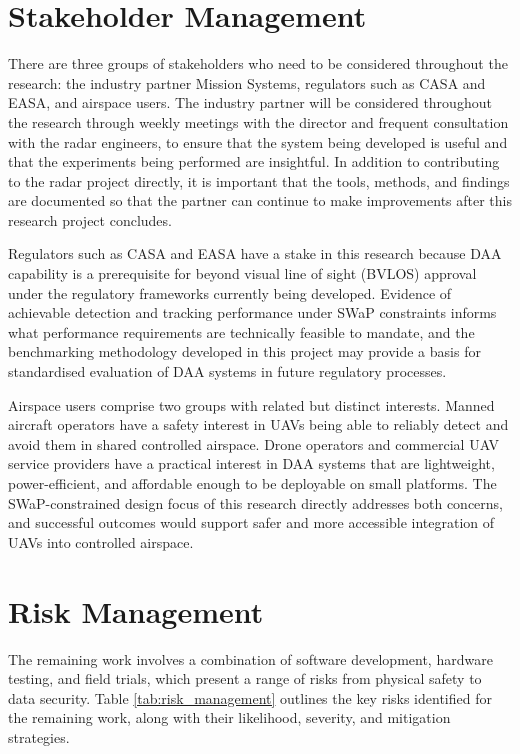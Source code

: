 \section{Stakeholder Management}
There are three groups of stakeholders who need to be considered throughout the research: the industry partner Mission Systems, regulators such as CASA and EASA, and airspace users. The industry partner will be considered throughout the research through weekly meetings with the director and frequent consultation with the radar engineers, to ensure that the system being developed is useful and that the experiments being performed are insightful. In addition to contributing to the radar project directly, it is important that the tools, methods, and findings are documented so that the partner can continue to make improvements after this research project concludes.

Regulators such as CASA and EASA have a stake in this research because DAA capability is a prerequisite for beyond visual line of sight (BVLOS) approval under the regulatory frameworks currently being developed. Evidence of achievable detection and tracking performance under SWaP constraints informs what performance requirements are technically feasible to mandate, and the benchmarking methodology developed in this project may provide a basis for standardised evaluation of DAA systems in future regulatory processes.

Airspace users comprise two groups with related but distinct interests. Manned aircraft operators have a safety interest in UAVs being able to reliably detect and avoid them in shared controlled airspace. Drone operators and commercial UAV service providers have a practical interest in DAA systems that are lightweight, power-efficient, and affordable enough to be deployable on small platforms. The SWaP-constrained design focus of this research directly addresses both concerns, and successful outcomes would support safer and more accessible integration of UAVs into controlled airspace.

\section{Risk Management}
The remaining work involves a combination of software development, hardware testing, 
and field trials, which present a range of risks from physical safety to data security. 
Table \ref{tab:risk_management} outlines the key risks identified for the remaining work, along
with their likelihood, severity, and mitigation strategies.

